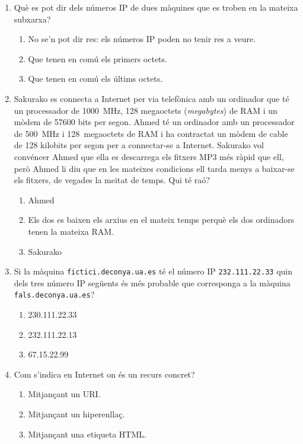 \begin{enumerate}
\item 
   Què es pot dir dels números IP de dues màquines que es 
   troben en la mateixa subxarxa?
   
\begin{enumerate}
\item No se'n pot dir res: els números IP poden no tenir res a veure.
\item Que tenen en comú els primers octets.
\item Que tenen en comú els últims octets.
\end{enumerate}

\item Sakurako es connecta a Internet per via telefònica amb un
   ordinador que té un processador de 1000~MHz, 128 megaoctets
   (\emph{megabytes}) de RAM i un mòdem de 57600 bits per segon.
   Ahmed té un ordinador amb un processador de 500~MHz i 128~megaoctets
   de RAM i ha contractat un mòdem de cable de 128 kilobits per segon
   per a connectar-se a Internet. Sakurako vol convéncer Ahmed que ella
   es descarrega els fitxers MP3 més ràpid que ell, però Ahmed li diu
   que en les mateixes condicions ell tarda menys a baixar-se els
   fitxers, de vegades la meitat de temps.  Qui té raó?
   
\begin{enumerate}
\item Ahmed
\item Els dos es baixen els arxius en el mateix temps perquè els
      dos ordinadors tenen la mateixa RAM.
\item Sakurako
\end{enumerate}

\item 
   Si la màquina \verb|fictici.deconya.ua.es| té el número IP
   \verb|232.111.22.33| quin dels tres número IP següents és més
   probable que corresponga a la màquina \verb|fals.deconya.ua.es|?
\begin{enumerate}
\item 230.111.22.33
\item 232.111.22.13
\item 67.15.22.99
\end{enumerate}

\item Com s'indica en Internet on és un recurs concret?   
\begin{enumerate}
\item Mitjançant un URI.
\item Mitjançant un hiperenllaç.
\item Mitjançant una etiqueta HTML.
\end{enumerate}



\end{enumerate}
